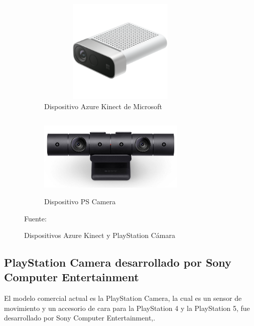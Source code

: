 \begin{figure}
	\centering
	\begin{subfigure}{.5\textwidth}
		\centering
		\includegraphics[width=8cm,height=5cm,]{./Images/azurekinect.png}
		\caption{Dispositivo Azure Kinect de Microsoft}
		\label{azureexample}
	\end{subfigure}%
	\begin{subfigure}{0.5\textwidth}
		\centering
		\includegraphics[width=7cm,height=4cm,]{./Images/cameraex.jpg}
		\caption{Dispositivo PS Camera}
		\label{cameraex}
	\end{subfigure}
	\caption{Dispositivos Azure Kinect y PlayStation Cámara}
	\footnotesize Fuente: \cite{cameraex} \cite{azurekinect}
	\label{AzureandCameraExample}
\end{figure}




\subsection{PlayStation Camera desarrollado por Sony Computer Entertainment}

El modelo comercial actual es la PlayStation Camera, la cual es un sensor de movimiento y un accesorio de cara para la PlayStation 4 y la PlayStation 5, fue desarrollado por Sony Computer Entertainment,.

